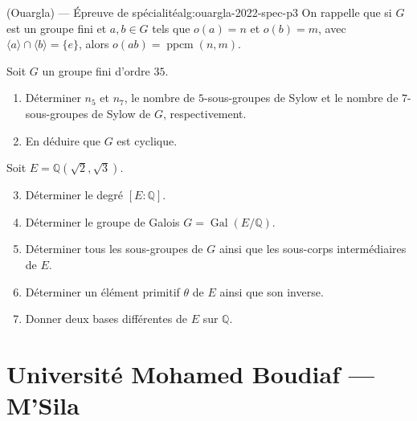 \begin{problem}{(Ouargla) — Épreuve de spécialité}{alg:ouargla-2022-spec-p3}
On rappelle que si $G$ est un groupe fini et $a,b\in G$ tels que $o(a)=n$ et
$o(b)=m$, avec $\langle a\rangle\cap\langle b\rangle=\{e\}$, alors
$o(ab)=\operatorname{ppcm}(n,m)$.

Soit $G$ un groupe fini d'ordre $35$.
\begin{enumerate}
\item Déterminer $n_5$ et $n_7$, le nombre de $5$-sous-groupes de Sylow et le nombre
      de $7$-sous-groupes de Sylow de $G$, respectivement.
\item En déduire que $G$ est cyclique.
\end{enumerate}
Soit $E=\mathbb{Q}\!\left(\sqrt{2},\sqrt{3}\right)$.
\begin{enumerate}
\setcounter{enumi}{2}
\item Déterminer le degré $[E:\mathbb{Q}]$.
\item Déterminer le groupe de Galois $G=\operatorname{Gal}(E/\mathbb{Q})$.
\item Déterminer tous les sous-groupes de $G$ ainsi que les sous-corps
      intermédiaires de $E$.
\item Déterminer un élément primitif $\theta$ de $E$ ainsi que son inverse.
\item Donner deux bases différentes de $E$ sur $\mathbb{Q}$.
\end{enumerate}

\end{problem}

\newpage

\section{Université Mohamed Boudiaf --- M'Sila}

